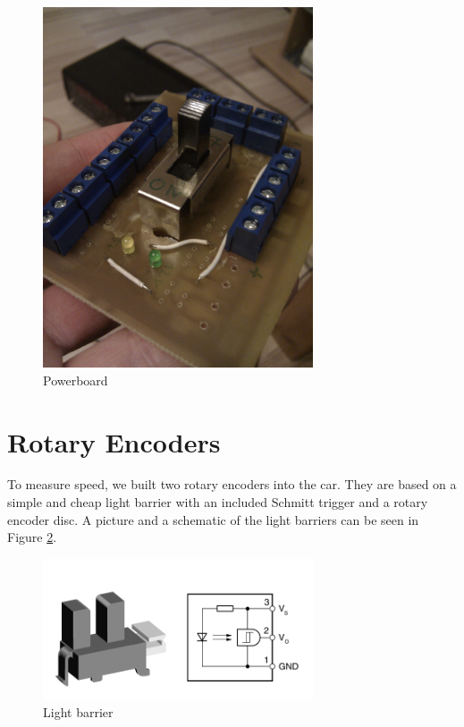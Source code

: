 \documentclass[12pt]{article}
\begin{document}
\begin{figure}[h]
\begin{center}
\includegraphics[width=8cm]{pic/powerboardr.jpg}
\caption{Powerboard}
\end{center}
\label{figpowerboardr}
\end{figure}


\section{Rotary Encoders} %

To measure speed, we built two rotary encoders into the car.
They are based on a simple and cheap light barrier with an included Schmitt trigger and a rotary encoder disc.
A picture and a schematic of the light barriers can be seen in Figure \ref{figls}.
\begin{figure}[h]
\begin{center}
\includegraphics[width=8cm]{pic/ls.png}
\caption{Light barrier}
\end{center}
\label{figls}
\end{figure}
\end{document}
